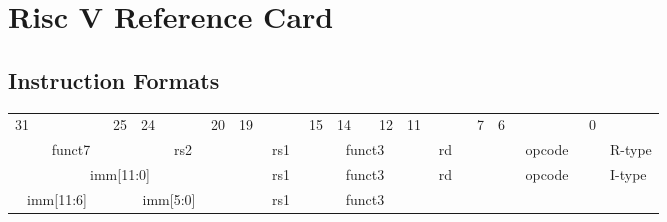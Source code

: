 \vspace*{-2cm}
\section*{Risc V Reference Card}

\subsection*{Instruction Formats}
    \begin{table}[h]
        \scriptsize
        \begin{tabular} %
            {p{0.01mm}p{0.01mm}p{0.01mm}p{0.01mm} p{0.01mm}p{0.01mm}p{0.01mm}p{0.01mm}
             p{0.01mm}p{0.01mm}p{0.01mm}p{0.01mm} p{0.01mm}p{0.01mm}p{0.01mm}p{0.01mm}
             p{0.01mm}p{0.01mm}p{0.01mm}p{0.01mm} p{0.01mm}p{0.01mm}p{0.01mm}p{0.01mm}
             p{0.01mm}p{0.01mm}p{0.01mm}p{0.01mm} p{0.01mm}p{0.01mm}p{0.01mm}p{0.01mm} l}
            \multicolumn{1}{c}{31}&&&&&&
            \multicolumn{1}{c}{25}&
            \multicolumn{1}{c}{24}&&&&
            \multicolumn{1}{c}{20}&
            \multicolumn{1}{c}{19}&&&&
            \multicolumn{1}{c}{15}&
            \multicolumn{1}{c}{14}&&
            \multicolumn{1}{c}{12}&
            \multicolumn{1}{c}{11}&&&&
            \multicolumn{1}{c}{7}&
            \multicolumn{1}{c}{6}&&&&&&
            \multicolumn{1}{c}{0}&
            \\
            \cline{0-31} 
            \multicolumn{7}{|c|}{funct7} &
            \multicolumn{5}{c|}{rs2}&
            \multicolumn{5}{c|}{rs1}&
            \multicolumn{3}{c|}{funct3}&
            \multicolumn{5}{c|}{rd}&
            \multicolumn{7}{c|}{opcode}&
            R-type
            \\
            \cline{0-31} 
            \multicolumn{12}{|c|}{imm[11:0]} &
            \multicolumn{5}{c|}{rs1}&
            \multicolumn{3}{c|}{funct3}&
            \multicolumn{5}{c|}{rd}&
            \multicolumn{7}{c|}{opcode}&
            I-type
            \\
            \cline{0-31} 
            \multicolumn{6}{|c|}{imm[11:6]} &
            \multicolumn{6}{c|}{imm[5:0]}&
            \multicolumn{5}{c|}{rs1}&
            \multicolumn{3}{c|}{funct3}&

\end{tabular}
\end{table}
